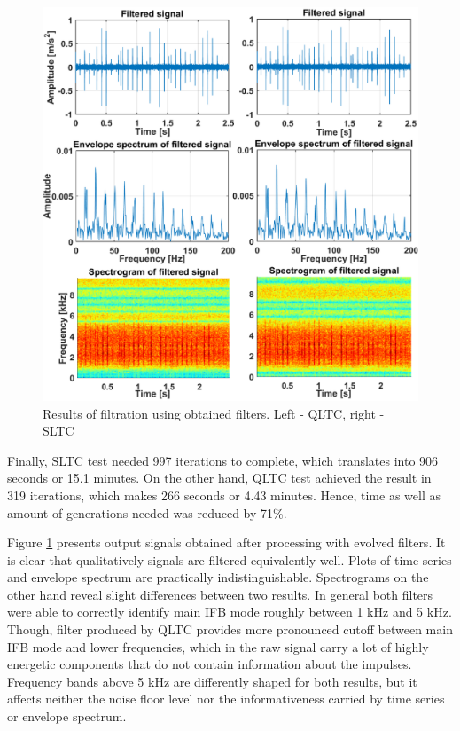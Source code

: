 \documentclass{svproc}
\begin{document}
\begin{figure}[ht!]
\centering
\includegraphics[width=\textwidth]{figs/result.eps}
\caption{Results of filtration using obtained filters. Left - QLTC, right - SLTC}
\label{fig:result}
\end{figure}

Finally, SLTC test needed 997 iterations to complete, which translates into 906 seconds or 15.1 minutes. On the other hand, QLTC test achieved the result in 319 iterations, which makes 266 seconds or 4.43 minutes. Hence, time as well as amount of generations needed was reduced by 71\%.



Figure \ref{fig:result} presents output signals obtained after processing with evolved filters. It is clear that qualitatively signals are filtered equivalently well. Plots of time series and envelope spectrum are practically indistinguishable. Spectrograms on the other hand reveal slight differences between two results. In general both filters were able to correctly identify main IFB mode roughly between 1 kHz and 5 kHz. Though, filter produced by QLTC provides more pronounced cutoff between main IFB mode and lower frequencies, which in the raw signal carry a lot of highly energetic components that do not contain information about the impulses. Frequency bands above 5 kHz are differently shaped for both results, but it affects neither the noise floor level nor the informativeness carried by time series or envelope spectrum.
\end{document}
